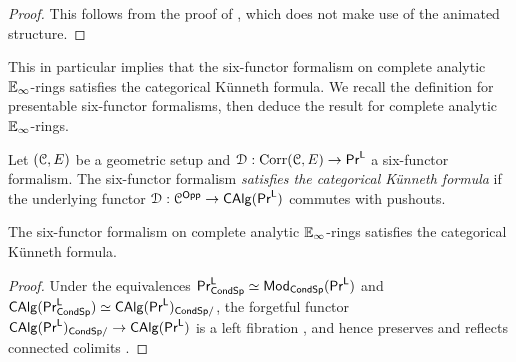 \begin{proof}
    This follows from the proof of \cite[Prop. 4.1.14]{CamargoSolid}, which does not make use of the animated structure. 
\end{proof}
This in particular implies that the six-functor formalism on complete analytic $\mathbb{E}_{\infty}$-rings satisfies the categorical K\"{u}nneth formula. We recall the definition for presentable six-functor formalisms, then deduce the result for complete analytic $\mathbb{E}_{\infty}$-rings.
\begin{definition}\label{def: categorical Kunneth formula}
    Let $(\EuScript{C},E)$ be a geometric setup and $\EuScript{D}:\mathrm{Corr}(\EuScript{C},E)\to\mathsf{Pr}^{\mathsf{L}}$ a six-functor formalism. The six-functor formalism \emph{satisfies the categorical K\"{u}nneth formula} if the underlying functor $\EuScript{D}:\EuScript{C}^{\mathsf{Opp}}\to\mathsf{CAlg}(\mathsf{Pr}^{\mathsf{L}})$ commutes with pushouts. 
\end{definition}
\begin{corollary}\label{cor: six-functor formalism on analytic E-infinity rings is kunneth}
    The six-functor formalism on complete analytic $\mathbb{E}_{\infty}$-rings satisfies the categorical K\"{u}nneth formula. 
\end{corollary}
\begin{proof}
    Under the equivalences $\mathsf{Pr}^{\mathsf{L}}_{\mathsf{Cond}\mathsf{Sp}}\simeq\mathsf{Mod}_{\mathsf{Cond}\mathsf{Sp}}(\mathsf{Pr}^{\mathsf{L}})$ and $\mathsf{CAlg}(\mathsf{Pr}^{\mathsf{L}}_{\mathsf{Cond}\mathsf{Sp}})\simeq\mathsf{CAlg}(\mathsf{Pr}^{\mathsf{L}})_{\mathsf{Cond}\mathsf{Sp}/}$, the forgetful functor $\mathsf{CAlg}(\mathsf{Pr}^{\mathsf{L}})_{\mathsf{Cond}\mathsf{Sp}/}\to\mathsf{CAlg}(\mathsf{Pr}^{\mathsf{L}})$ is a left fibration \cite[\href{https://kerodon.net/tag/018F}{Tag 018F}]{kerodon}, and hence preserves and reflects connected colimits \cite[\href{https://kerodon.net/tag/02KT}{Tag 02KT}]{kerodon}. 
\end{proof}

